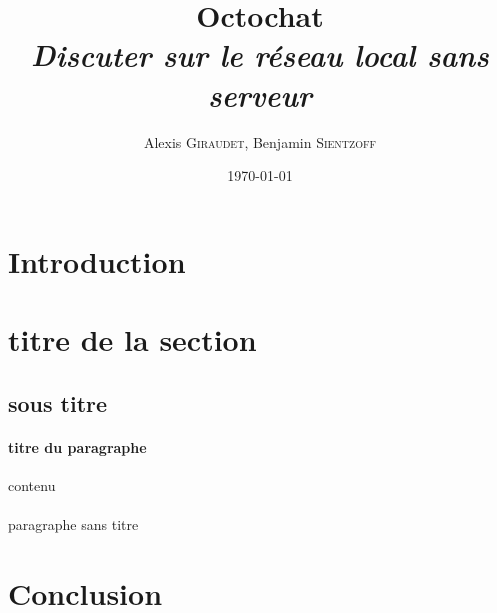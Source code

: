 \documentclass[a4paper]{article}
\title{Octochat \\ \textit{Discuter sur le réseau local sans serveur}}
\author{Alexis \textsc{Giraudet}, Benjamin \textsc{Sientzoff}}
\date{\today}
\begin{document}
	\maketitle
	\vspace{5cm}
	\tableofcontents
	\newpage
	
	\section*{Introduction}
	\newpage
	
	\section{titre de la section}
	\subsection{sous titre}
	\paragraph{titre du paragraphe}{contenu}
	\paragraph{}{paragraphe sans titre}
	
	\section*{Conclusion}
\end{document}
